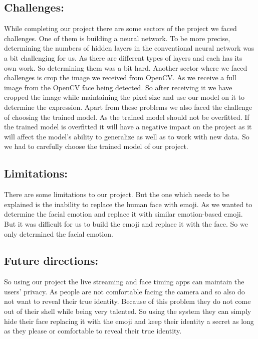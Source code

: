 \documentclass[conference]{IEEEtran}
\begin{document}
\subsection{Challenges:}
While completing our project there are some sectors of the project we faced challenges. One of them is building a neural network. To be more precise, determining the numbers of hidden layers in the conventional neural network was a bit challenging for us. As there are different types of layers and each has its own work. So determining them was a bit hard.
Another sector where we faced challenges is crop the image we received from OpenCV. As we receive a full image from the OpenCV face being detected. So after receiving it we have cropped the image while maintaining the pixel size and use our model on it to determine the expression.
Apart from these problems we also faced the challenge of choosing the trained model. As the trained model should not be overfitted. If the trained model is overfitted it will have a negative impact on the project as it will affect the model’s ability to generalize as well as to work with new data. So we had to carefully choose the trained model of our project.   

\subsection{Limitations:}
There are some limitations to our project. But the one which needs to be explained is the inability to replace the human face with emoji.  As we wanted to determine the facial emotion and replace it with similar emotion-based emoji. But it was difficult for us to build the emoji and replace it with the face. So we only determined the facial emotion.

\subsection{Future directions:}
So using our project the live streaming and face timing apps can maintain the users’ privacy. As people are not comfortable facing the camera and so also do not want to reveal their true identity. Because of this problem they do not come out of their shell while being very talented. So using the system they can simply hide their face replacing it with the emoji and keep their identity a secret as long as they please or comfortable to reveal their true identity.




\end{document}
